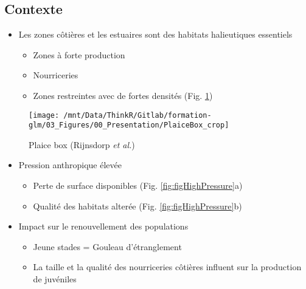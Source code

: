 \documentclass[french,a4paper]{article}
\providecommand{\tightlist}{%
  \setlength{\itemsep}{0pt}\setlength{\parskip}{0pt}}
\begin{document}
\subsection{Contexte}\label{contexte}

\begin{itemize}
\tightlist
\item
  Les zones côtières et les estuaires sont des habitats halieutiques
  essentiels

  \begin{itemize}
  \tightlist
  \item
    Zones à forte production
  \item
    Nourriceries
  \item
    Zones restreintes avec de fortes densités (Fig.
    \ref{fig:figPlaiceBox})
  \end{itemize}
\end{itemize}



\begin{figure}[!h]

{\centering \texttt{[image: /mnt/Data/ThinkR/Gitlab/formation-glm/03\_Figures/00\_Presentation/PlaiceBox\_crop]} 

}

\caption{Plaice box (Rijnsdorp \emph{et al.})}\label{fig:figPlaiceBox}
\end{figure}

\begin{itemize}
\tightlist
\item
  Pression anthropique élevée

  \begin{itemize}
  \tightlist
  \item
    Perte de surface disponibles (Fig. \ref{fig:figHighPressure}a)
  \item
    Qualité des habitats alterée (Fig. \ref{fig:figHighPressure}b)
  \end{itemize}
\end{itemize}




\begin{itemize}
\tightlist
\item
  Impact sur le renouvellement des populations

  \begin{itemize}
  \tightlist
  \item
    Jeune stades = Gouleau d'étranglement
  \item
    La taille et la qualité des nourriceries côtières influent sur la
    production de juvéniles
  \end{itemize}
\end{itemize}
\end{document}
